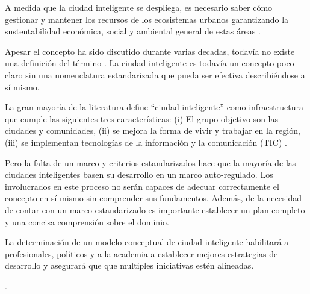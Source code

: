 \documentclass[a4paper,fleqn,spanish]{cas-dc}
\begin{document}
A medida que
la ciudad inteligente se despliega, es necesario saber cómo
gestionar y mantener los recursos de los ecosistemas urbanos
garantizando la sustentabilidad económica,
social y ambiental general de estas áreas \cite{aljowder_systematic_2019, stubinger_understanding_2020}.

Apesar el concepto ha sido discutido durante varias decadas,
todavía no existe una definición del término
\cite{wahab_systematic_2020}.
La ciudad inteligente es todavía un
concepto poco claro sin una nomenclatura estandarizada que pueda ser
efectiva describiéndose a sí mismo.

La gran mayoría de la literatura define “ciudad inteligente” como
infraestructura que cumple las siguientes tres características:
(i) El grupo objetivo son las ciudades y comunidades,
(ii) se mejora la forma de vivir y trabajar en la región,
(iii) se implementan tecnologías de la información y la comunicación (TIC)
\cite{stubinger_understanding_2020}.

Pero la falta de un marco y criterios estandarizados
hace que la mayoría de las ciudades inteligentes basen su
desarrollo en un marco auto-regulado.
Los involucrados en este proceso
no serán capaces de adecuar correctamente el concepto
en sí mismo sin comprender sus fundamentos.
Además, de la necesidad de contar con un marco estandarizado
es importante establecer un plan completo y
una concisa comprensión sobre el dominio.

La determinación de un modelo conceptual de ciudad inteligente
habilitará a profesionales, políticos y a la academia
a establecer mejores estrategias de desarrollo
y asegurará que que multiples iniciativas estén alineadas.

.



\end{document}
